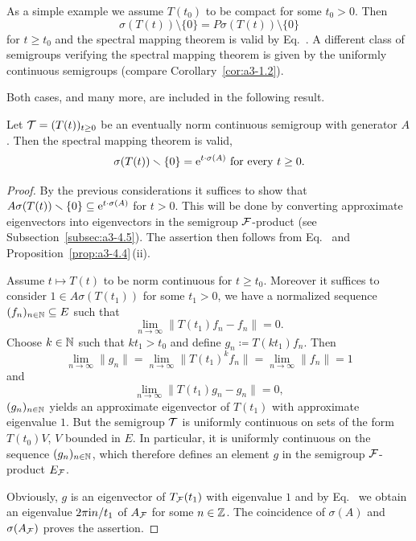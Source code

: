 As a simple example we assume $T(t_{0})$ to be compact for some $t_{0} > 0$.
Then %
\[
	\sigma(T(t)) \setminus \{0\} = P\sigma(T(t)) \setminus \{0\}
\]
%
for $t \geq t_{0}$ and the spectral mapping theorem is valid by Eq.~.
A different class of semigroups verifying the spectral mapping theorem is given by the uniformly continuous semigroups (compare Corollary~\ref{cor:a3-1.2}).

Both cases, and many more, are included in the following result.
\begin{theorem}\label{thm:a3-6.6}%
Let $\TT = (T(t))_{t\geq 0}$ be an eventually norm continuous semigroup with generator $A$.
Then the spectral mapping theorem is valid, \ie 
\begin{equation}\label{eq:a3-6.6}
	\sigma(T(t)) \setminus \{0\} = \eu^{t \cdot \sigma(A)} \text{ for every } t \geq 0 .
\end{equation}
\end{theorem}
\begin{proof}
By the previous considerations it suffices to show that $A\sigma(T(t)) \smallsetminus \{0\} \subseteq \mathrm{e}^{t \cdot \sigma(A)}$ for $t > 0$.
This will be done by converting approximate eigenvectors into eigenvectors in the semigroup $\mathcal{F}$-product (see Subsection~\ref{subsec:a3-4.5}).
The assertion then follows from Eq.~ and Proposition~\ref{prop:a3-4.4}\,(ii).

Assume $t \mapsto T(t)$ to be norm continuous for $t \geq t_{0}$.
Moreover it suffices to consider $1 \in A\sigma(T(t_{1}))$ for some $t_{1} > 0$, \ie we have a normalized sequence $(f_{n})_{n\in\mathbb{N}} \subseteq E$ such that
\[
\lim_{n\to\infty} \|T(t_{1})f_{n} - f_{n}\| = 0 .
\]
Choose $k \in \mathbb{N}$ such that $kt_{1} > t_{0}$ and define $g_{n} \coloneq T(kt_{1})f_{n}$.
Then
\[
\lim_{n\to\infty}\|g_{n}\| = \lim_{n\to\infty}\|T(t_{1})^{k}f_{n}\| = \lim_{n\to\infty}\|f_{n}\| = 1
\]
and
\[
\lim_{n\to\infty} \|T(t_{1})g_{n} - g_{n}\| = 0 ,
\]
\ie $(g_{n})_{n\in\mathbb{N}}$ yields an approximate eigenvector 
of\/ $T(t_{1})$ with approximate eigenvalue $1$.
But the semigroup $\mathcal{T}$ is uniformly continuous on sets of the form $T(t_{0})V$, $V$ bounded in $E$.
In particular, it is uniformly continuous on the sequence $(g_{n})_{n\in\mathbb{N}}$, which therefore defines an element $g$ in the semigroup $\mathcal{F}$-product $E_{\mathcal{F}}$.

Obviously, $g$ is an eigenvector of\/ $T_{\mathcal{F}}(t_{1})$ with eigenvalue $1$ and by Eq.~ we obtain an eigenvalue $2\pi\mathrm{i}  n/t_{1}$ of\/ $A_{\mathcal{F}}$ for some $n \in \mathbb{Z}$.
The coincidence of\/ $\sigma(A)$ and $\sigma(A_{\mathcal{F}})$ proves the assertion.
\end{proof}
